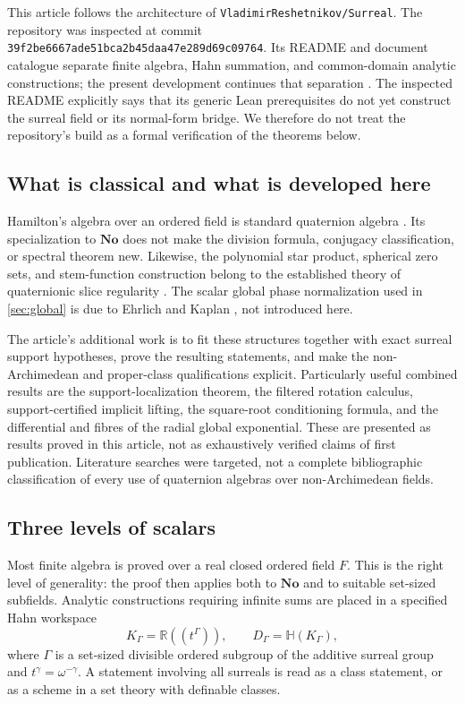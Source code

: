 \documentclass[11pt,letterpaper]{article}
\theoremstyle{definition}
\newcommand{\No}{\mathbf{No}}
\newcommand{\R}{\mathbb R}
\newcommand{\HH}{\mathbb H}
\newcommand{\repo}{\texttt{VladimirReshetnikov/Surreal}}
\begin{document}
This article follows the architecture of \repo.
The repository was inspected at commit
\texttt{39f2be6667ade51bca2b45daa47e289d69c09764}. Its README and document catalogue
separate finite algebra, Hahn summation, and common-domain analytic constructions;
the present development continues that separation \cite{repo}. The inspected
README explicitly says that its generic Lean prerequisites do not yet construct
the surreal field or its normal-form bridge. We therefore do not treat the
repository's build as a formal verification of the theorems below.

\subsection{What is classical and what is developed here}
Hamilton's algebra over an ordered field is standard quaternion algebra
\cite{voight}. Its specialization to $\No$ does not make the division formula,
conjugacy classification, or spectral theorem new. Likewise, the polynomial
star product, spherical zero sets, and stem-function construction belong to the
established theory of quaternionic slice regularity \cite{gp}. The scalar global
phase normalization used in \cref{sec:global} is due to Ehrlich and Kaplan
\cite{ek}, not introduced here.

The article's additional work is to fit these structures together with exact
surreal support hypotheses, prove the resulting statements, and make the
non-Archimedean and proper-class qualifications explicit. Particularly useful
combined results are the support-localization theorem, the filtered rotation
calculus, support-certified implicit lifting, the square-root conditioning
formula, and the differential and fibres of the radial global exponential.
These are presented as results proved in this article, not as exhaustively
verified claims of first publication. Literature searches were targeted, not a
complete bibliographic classification of every use of quaternion algebras over
non-Archimedean fields.

\subsection{Three levels of scalars}
Most finite algebra is proved over a real closed ordered field $F$. This is the
right level of generality: the proof then applies both to $\No$ and to suitable
set-sized subfields. Analytic constructions requiring infinite sums are placed
in a specified Hahn workspace
\[
 K_\Gamma=\R((t^\Gamma)),\qquad D_\Gamma=\HH(K_\Gamma),
\]
where $\Gamma$ is a set-sized divisible ordered subgroup of the additive surreal
group and $t^\gamma=\omega^{-\gamma}$. A statement involving all surreals is read
as a class statement, or as a scheme in a set theory with definable classes.
\end{document}
